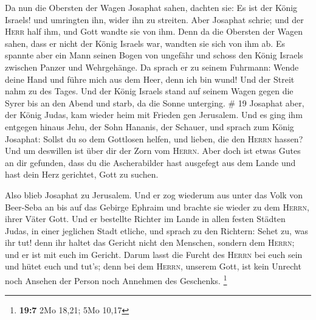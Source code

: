  Da nun die Obersten der Wagen Josaphat sahen, dachten
sie: Es ist der König Israels! und umringten ihn, wider ihn zu streiten.
Aber Josaphat schrie; und der \textsc{Herr} half ihm, und Gott wandte
sie von ihm.  Denn da die Obersten der Wagen sahen, dass
er nicht der König Israels war, wandten sie sich von ihm ab.
 Es spannte aber ein Mann seinen Bogen von ungefähr und
schoss den König Israels zwischen Panzer und Wehrgehänge. Da sprach er
zu seinem Fuhrmann: Wende deine Hand und führe mich aus dem Heer, denn
ich bin wund!  Und der Streit nahm zu des Tages. Und der
König Israels stand auf seinem Wagen gegen die Syrer bis an den Abend
und starb, da die Sonne unterging. \# 19  Josaphat aber,
der König Judas, kam wieder heim mit Frieden gen Jerusalem.
 Und es ging ihm entgegen hinaus Jehu, der Sohn Hananis,
der Schauer, und sprach zum König Josaphat: Sollst du so dem Gottlosen
helfen, und lieben, die den \textsc{Herrn} hassen? Und um deswillen ist
über dir der Zorn vom \textsc{Herrn}.  Aber doch ist etwas
Gutes an dir gefunden, dass du die Ascherabilder hast ausgefegt aus dem
Lande und hast dein Herz gerichtet, Gott zu suchen.

 Also blieb Josaphat zu Jerusalem. Und er zog wiederum aus
unter das Volk von Beer-Seba an bis auf das Gebirge Ephraim und brachte
sie wieder zu dem \textsc{Herrn}, ihrer Väter Gott.  Und
er bestellte Richter im Lande in allen festen Städten Judas, in einer
jeglichen Stadt etliche,  und sprach zu den Richtern:
Sehet zu, was ihr tut! denn ihr haltet das Gericht nicht den Menschen,
sondern dem \textsc{Herrn}; und er ist mit euch im Gericht.
 Darum lasst die Furcht des \textsc{Herrn} bei euch sein
und hütet euch und tut's; denn bei dem \textsc{Herrn}, unserem Gott, ist
kein Unrecht noch Ansehen der Person noch Annehmen des Geschenks.
\footnote{\textbf{19:7} 2Mo 18,21; 5Mo 10,17}

